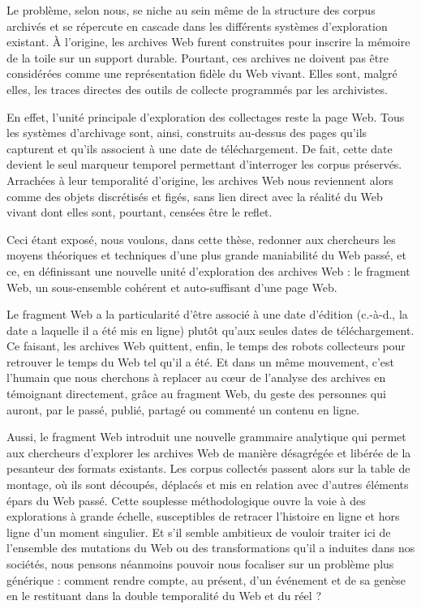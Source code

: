 \documentclass[symmetric,justified,marginals=raggedouter]{tufte-book}
\begin{document}
\noindent Le problème, selon nous, se niche au sein même de la structure des corpus archivés et se répercute en cascade dans les différents systèmes d'exploration existant. À l'origine, les archives Web furent construites pour inscrire la mémoire de la toile sur un support durable. Pourtant, ces archives ne doivent pas être considérées comme une représentation fidèle du Web vivant. Elles sont, malgré elles, les traces directes des outils de collecte programmés par les archivistes. 

En effet, l'unité principale d'exploration des collectages reste la page Web. Tous les systèmes d'archivage sont, ainsi, construits au-dessus des pages qu'ils capturent et qu'ils associent à une date de téléchargement. De fait, cette date devient le seul marqueur temporel permettant d'interroger les corpus préservés. Arrachées à leur temporalité d'origine, les archives Web nous reviennent alors comme des objets discrétisés et figés, sans lien direct avec la réalité du Web vivant dont elles sont, pourtant, censées être le reflet.

Ceci étant exposé, nous voulons, dans cette thèse, redonner aux chercheurs les moyens théoriques et techniques d'une plus grande maniabilité du Web passé, et ce, en définissant une nouvelle unité d'exploration des archives Web : le fragment Web, un sous-ensemble cohérent et auto-suffisant d'une page Web. 

Le fragment Web a la particularité d'être associé à une date d'édition (c.-à-d., la date a laquelle il a été mis en ligne) plutôt qu'aux seules dates de téléchargement. Ce faisant, les archives Web quittent, enfin, le temps des robots collecteurs pour retrouver le temps du Web tel qu'il a été. Et dans un même mouvement, c'est l'humain que nous cherchons à replacer au cœur de l'analyse des archives en témoignant directement, grâce au fragment Web, du geste des personnes qui auront, par le passé, publié, partagé ou commenté un contenu en ligne.   

Aussi, le fragment Web introduit une nouvelle grammaire analytique qui permet aux chercheurs d'explorer les archives Web de manière désagrégée et libérée de la pesanteur des formats existants. Les corpus collectés passent alors sur la table de montage, où ils sont découpés, déplacés et mis en relation avec d'autres éléments épars du Web passé. Cette souplesse méthodologique ouvre la voie à des explorations à grande échelle, susceptibles de retracer l'histoire en ligne et hors ligne d'un moment singulier. Et s'il semble ambitieux de vouloir traiter ici de l'ensemble des mutations du Web ou des transformations qu'il a induites dans nos sociétés, nous pensons néanmoins pouvoir nous focaliser sur un problème plus générique : comment rendre compte, au présent, d'un événement et de sa genèse en le restituant dans la double temporalité du Web et du réel ?
\end{document}
